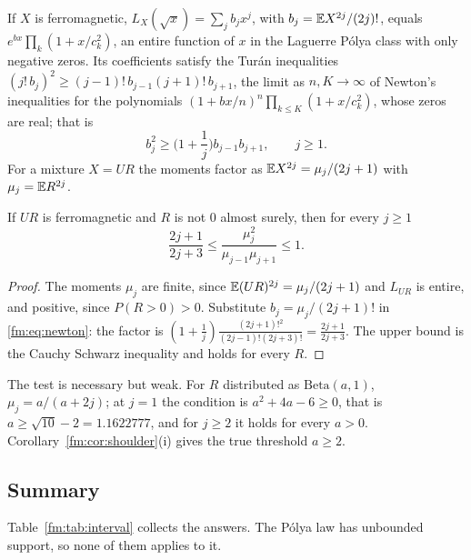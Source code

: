 If $X$ is ferromagnetic, $L_X(\sqrt x)=\sum_jb_jx^j$, with $b_j=\mathbb{E} X^{2j}/(2j)!$, equals $e^{bx}\prod_k(1+x/c_k^2)$, an entire function of $x$ in the Laguerre P\'olya class with only negative zeros. Its coefficients satisfy the Tur\'an inequalities $(j!\,b_j)^2\ge(j-1)!\,b_{j-1}(j+1)!\,b_{j+1}$, the limit as $n,K\to\infty$ of Newton's inequalities for the polynomials $(1+bx/n)^n\prod_{k\le K}(1+x/c_k^2)$, whose zeros are real; that is
\begin{equation}\label{fm:eq:newton}
b_j^2\ge\Big(1+\frac1j\Big)b_{j-1}b_{j+1},\qquad j\ge1 .
\end{equation}
For a mixture $X=UR$ the moments factor as $\mathbb{E} X^{2j}=\mu_j/(2j+1)$ with $\mu_j=\mathbb{E} R^{2j}$.

\begin{proposition}\label{fm:prop:moments}
If $UR$ is ferromagnetic and $R$ is not $0$ almost surely, then for every $j\ge1$
\[
\frac{2j+1}{2j+3}\le\frac{\mu_j^2}{\mu_{j-1}\mu_{j+1}}\le1 .
\]
\end{proposition}

\begin{proof}
The moments $\mu_j$ are finite, since $\mathbb{E}(UR)^{2j}=\mu_j/(2j+1)$ and $L_{UR}$ is entire, and positive, since $P(R>0)>0$. Substitute $b_j=\mu_j/(2j+1)!$ in \eqref{fm:eq:newton}: the factor is $(1+\frac1j)\frac{(2j+1)!^2}{(2j-1)!(2j+3)!}=\frac{2j+1}{2j+3}$. The upper bound is the Cauchy Schwarz inequality and holds for every $R$.
\end{proof}

The test is necessary but weak. For $R$ distributed as $\mathrm{Beta}(a,1)$, $\mu_j=a/(a+2j)$; at $j=1$ the condition is $a^2+4a-6\ge0$, that is $a\ge\sqrt{10}-2=1.1622777$, and for $j\ge2$ it holds for every $a>0$. Corollary~\ref{fm:cor:shoulder}(i) gives the true threshold $a\ge2$.

\subsection{Summary}\label{fm:sec:intervalsummary}

Table~\ref{fm:tab:interval} collects the answers. The P\'olya law has unbounded support, so none of them applies to it.

